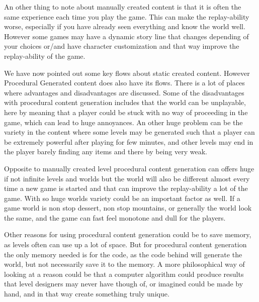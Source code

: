 An other thing to note about manually created content is that it is often the same experience each time you play the game. This can make the replay-ability worse, especially if you have already seen everything and know the world well. However some games may have a dynamic story line that changes depending of your choices or/and have character customization and that way improve the replay-ability of the game.

We have now pointed out some key flows about static created content. However Procedural Generated content does also have its flows. There is a lot of places where advantages and disadvantages are discussed. Some of the disadvantages with procedural content generation includes that the world can be unplayable, here by meaning that a player could be stuck with no way of proceeding in the game, which can lead to huge annoyances. An other huge problem can be the variety in the content where some levels may be generated such that a player can be extremely powerful after playing for few minutes, and other levels may end in the player barely finding any items and there by being very weak.

Opposite to manually created level procedural content generation can offers huge if not infinite levels and worlds but the world will also be different almost every time a new game is started and that can improve the replay-ability a lot of the game. With so huge worlds variety could be an important factor as well. If a game world is non stop dessert, non stop mountains, or generally the world look the same, and the game can fast feel monotone and dull for the players.

Other reasons for using procedural content generation could be to save memory, as levels often can use up a lot of space. But for procedural content generation the only memory needed is for the code, as the code behind will generate the world, but not necessarily save it to the memory. A more philosophical way of looking at a reason could be that a computer algorithm could produce results that level designers may never have though of, or imagined could be made by hand, and in that way create something truly unique.